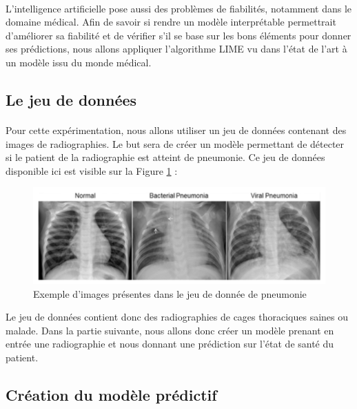 \paragraph{}L'intelligence artificielle pose aussi des problèmes de fiabilités, notamment dans le domaine médical. Afin de savoir si rendre un modèle interprétable permettrait d'améliorer sa fiabilité et de vérifier s'il se base sur les bons éléments pour donner ses prédictions, nous allons appliquer l'algorithme LIME vu dans l'état de l'art à un modèle issu du monde médical.

\subsection{Le jeu de données}
\paragraph{}Pour cette expérimentation, nous allons utiliser un jeu de données contenant des images de radiographies. Le but sera de créer un modèle permettant de détecter si le patient de la radiographie est atteint de pneumonie. Ce jeu de données disponible ici \cite{kagglePneumonia} est visible sur la Figure \ref{pneumoniaImg} :
\begin{figure}[h]
    \includegraphics[scale=0.7]{src_img/pneumoniaImg.png}
    \caption{Exemple d'images présentes dans le jeu de donnée de pneumonie}
    \label{pneumoniaImg}
\end{figure}
Le jeu de données contient donc des radiographies de cages thoraciques saines ou malade. Dans la partie suivante, nous allons donc créer un modèle prenant en entrée une radiographie et nous donnant une prédiction sur l'état de santé du patient.

\subsection{Création du modèle prédictif}
